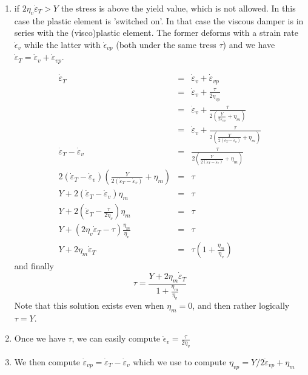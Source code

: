 \begin{itemize}
\begin{enumerate}
\item if $2 \eta_v \dot\varepsilon_T > Y$ the stress is above the yield value, which is not allowed. In this case the plastic element is 'switched on'. In that case the viscous damper is in series with the (visco)plastic element. The former deforms with a strain rate $\dot\epsilon_v$ while the latter with $\dot\epsilon_{vp}$ (both under the same tress $\tau$) and we have  $\dot\varepsilon_T = \dot\varepsilon_v  + \dot\varepsilon_{vp}$. 

\begin{eqnarray}
\dot\varepsilon_T 
&=& \dot\varepsilon_v + \dot\varepsilon_{vp}  \nonumber\\
&=& \dot\varepsilon_v + \frac{\tau}{2 \eta_{vp}} \nonumber\\
&=& \dot\varepsilon_v + \frac{\tau}{2 \left( \frac{Y}{2\dot\varepsilon_{vp}} + \eta_m  \right)} \nonumber\\
&=& \dot\varepsilon_v + \frac{\tau}{2 \left( \frac{Y}{2(\dot\varepsilon_T-\dot\varepsilon_v)}+\eta_m\right)} \nonumber\\
\dot\varepsilon_T - \dot\varepsilon_v 
&=& \frac{\tau}{2 \left( \frac{Y}{2(\dot\varepsilon_T-\dot\varepsilon_v)}+\eta_m\right)} \nonumber\\
2 (\dot\varepsilon_T - \dot\varepsilon_v)
\left( \frac{Y}{2(\dot\varepsilon_T-\dot\varepsilon_v)}+\eta_m\right) &=& \tau \nonumber\\
Y +  2(\dot\varepsilon_T - \dot\varepsilon_v) \eta_m &=& \tau \nonumber\\
Y +  2(\dot\varepsilon_T - \frac{\tau}{2 \eta_v}) \eta_m &=& \tau \nonumber\\
Y +  (2\eta_v \dot\varepsilon_T - \tau) \frac{\eta_m}{\eta_v} &=& \tau \nonumber\\
Y +  2\eta_m \dot\varepsilon_T  &=& \tau (1 + \frac{\eta_m}{\eta_v} ) \nonumber
\end{eqnarray}
and finally 
\begin{equation}
\tau  = \frac{Y + 2 \eta_m \dot\varepsilon_T} {1+ \frac{\eta_m}{\eta_v} }
\end{equation}
Note that this solution exists even when $\eta_m=0$, and then rather logically $\tau=Y$.

\item Once we have $\tau$, we can easily compute $\dot\epsilon_v = \frac{\tau}{2\eta_v}$

\item We then compute $\dot\varepsilon_{vp} = \dot\varepsilon_T- \dot\varepsilon_v$ which 
we use to compute $\eta_{vp} = Y/2\dot\varepsilon_{vp}+\eta_m$


\end{enumerate}
\end{itemize}
